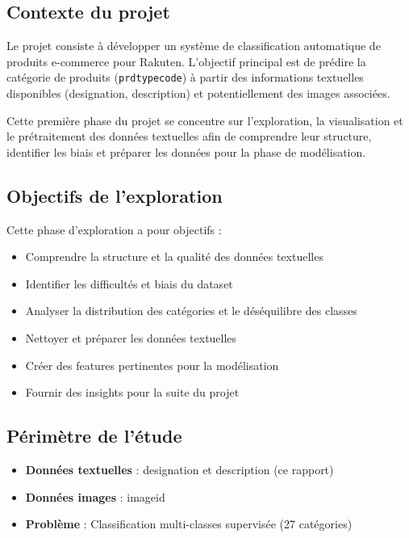 \documentclass[12pt,a4paper]{article}
\begin{document}
\subsection{Contexte du projet}

Le projet consiste à développer un système de classification automatique de produits e-commerce pour Rakuten. L'objectif principal est de prédire la catégorie de produits (\texttt{prdtypecode}) à partir des informations textuelles disponibles (designation, description) et potentiellement des images associées.

Cette première phase du projet se concentre sur l'exploration, la visualisation et le prétraitement des données textuelles afin de comprendre leur structure, identifier les biais et préparer les données pour la phase de modélisation.

\subsection{Objectifs de l'exploration}

Cette phase d'exploration a pour objectifs :

\begin{itemize}
    \item Comprendre la structure et la qualité des données textuelles
    \item Identifier les difficultés et biais du dataset
    \item Analyser la distribution des catégories et le déséquilibre des classes
    \item Nettoyer et préparer les données textuelles
    \item Créer des features pertinentes pour la modélisation
    \item Fournir des insights pour la suite du projet
\end{itemize}

\subsection{Périmètre de l'étude}

\begin{itemize}
    \item \textbf{Données textuelles} : designation et description (ce rapport)
    \item \textbf{Données images} : imageid
    \item \textbf{Problème} : Classification multi-classes supervisée (27 catégories)
\end{itemize}
\end{document}
